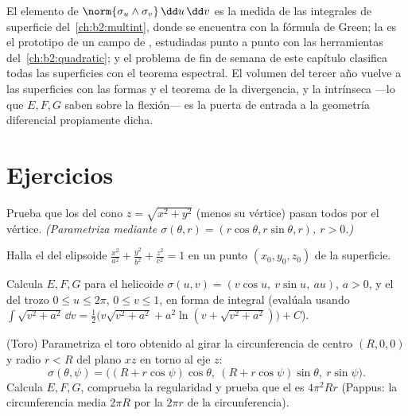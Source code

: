 \begin{remark}
El elemento de  $\norm{\sigma_u\wedge\sigma_v}\,\dd u\,\dd v$ es
la medida de las integrales de superficie del~\cref{ch:b2:multint},
donde se encuentra con la fórmula de Green; la
 es el prototipo de un campo de
, estudiadas punto a punto con las herramientas
del~\cref{ch:b2:quadratic}; y el problema de fin de semana de este
capítulo clasifica todas las superficies  con el teorema
espectral. El volumen del tercer año vuelve a las superficies con las
formas  y el teorema de la divergencia, y la
 intrínseca ---lo que $E, F, G$ saben sobre la flexión--- es
la puerta de entrada a la geometría diferencial propiamente dicha.
\end{remark}

\section{Ejercicios}

\begin{exercise}[$\star$]\label{exo:b2:surfaces:1}
Prueba que los  del cono $z = \sqrt{x^2 + y^2}$
(menos su vértice) pasan todos por el vértice. \emph{(Parametriza
mediante $\sigma(\theta, r) = (r\cos\theta, r\sin\theta, r)$, $r >
0$.)}
\end{exercise}

\begin{exercise}[$\star$]\label{exo:b2:surfaces:2}
Halla el  del elipsoide $\frac{x^2}{a^2} +
\frac{y^2}{b^2} + \frac{z^2}{c^2} = 1$ en un punto $(x_0, y_0, z_0)$
de la superficie.
\end{exercise}

\begin{exercise}[$\star$]\label{exo:b2:surfaces:3}
Calcula $E, F, G$ para el helicoide $\sigma(u, v) = (v\cos u,\ v\sin
u,\ au)$, $a > 0$, y el  del trozo $0 \leq u \leq 2\pi$, $0 \leq
v \leq 1$, en forma de integral (evalúala usando $\int\sqrt{v^2 +
a^2}\,\dd v = \frac12\bigl(v\sqrt{v^2+a^2} + a^2\ln(v + \sqrt{v^2 +
a^2})\bigr) + C$).
\end{exercise}

\begin{exercise}[$\star\star$]\label{exo:b2:surfaces:4}
(Toro) Parametriza el toro obtenido al girar la circunferencia de
centro $(R, 0, 0)$ y radio $r < R$ del plano $xz$ en torno al eje
$z$:
\[
\sigma(\theta, \psi) = \bigl((R + r\cos\psi)\cos\theta,\
(R + r\cos\psi)\sin\theta,\ r\sin\psi\bigr).
\]
Calcula $E, F, G$, comprueba la regularidad y prueba que el  es
$4\pi^2 R r$ (Pappus: la circunferencia media $2\pi R$ por la
 $2\pi r$ de la circunferencia).
\end{exercise}

